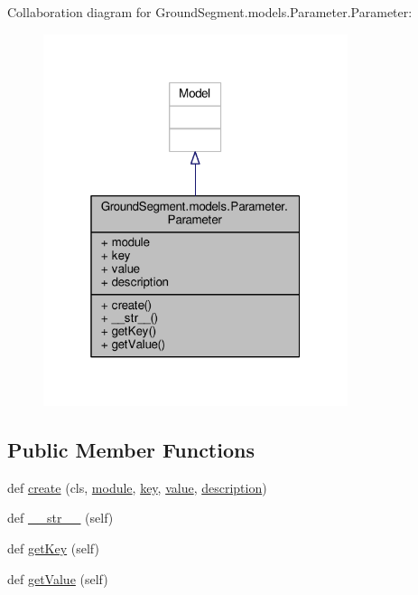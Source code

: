 Collaboration diagram for Ground\+Segment.\+models.\+Parameter.\+Parameter\+:\nopagebreak
\begin{figure}[H]
\begin{center}
\leavevmode
\includegraphics[width=253pt]{class_ground_segment_1_1models_1_1_parameter_1_1_parameter__coll__graph}
\end{center}
\end{figure}
\subsection*{Public Member Functions}
\begin{DoxyCompactItemize}
\item 
def \hyperlink{class_ground_segment_1_1models_1_1_parameter_1_1_parameter_a27550c05a3436bf646f99b9b331ae149}{create} (cls, \hyperlink{class_ground_segment_1_1models_1_1_parameter_1_1_parameter_a880b8fa5882db5b609d5e31c71a12791}{module}, \hyperlink{class_ground_segment_1_1models_1_1_parameter_1_1_parameter_adb452d16d2b26aa423a928b243cf8a18}{key}, \hyperlink{class_ground_segment_1_1models_1_1_parameter_1_1_parameter_a7186899b0882d6b4134ca24ed6f2bbc8}{value}, \hyperlink{class_ground_segment_1_1models_1_1_parameter_1_1_parameter_a685979e7244995a427107dcd31ce55ff}{description})
\item 
def \hyperlink{class_ground_segment_1_1models_1_1_parameter_1_1_parameter_a98a8c7d5a16cb7e6bf0148b39dbe2bfe}{\+\_\+\+\_\+str\+\_\+\+\_\+} (self)
\item 
def \hyperlink{class_ground_segment_1_1models_1_1_parameter_1_1_parameter_a435572aa3457b11e8aa00a7efa0dc7e9}{get\+Key} (self)
\item 
def \hyperlink{class_ground_segment_1_1models_1_1_parameter_1_1_parameter_a83a53921b96c1db22b502f6a25d1a295}{get\+Value} (self)
\end{DoxyCompactItemize}
